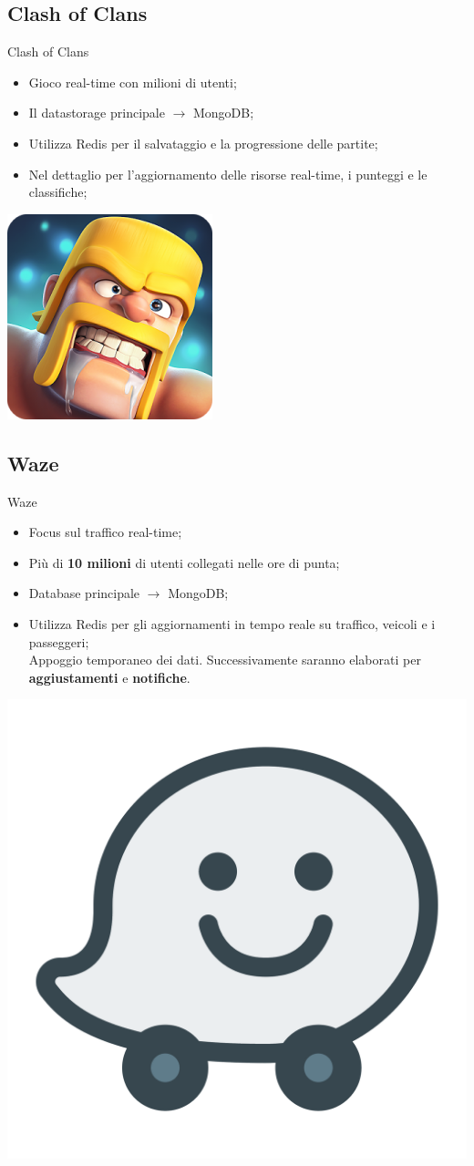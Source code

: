 \documentclass[xcolor=dvipsnames]{beamer}
\begin{document}
      \subsection{Clash of Clans}
        \begin{frame}{Clash of Clans}
          \begin{itemize}
            \item Gioco real-time con milioni di utenti;
            \item Il datastorage principale $\rightarrow$ MongoDB;
            \item Utilizza Redis per il salvataggio e la progressione delle partite;
            \item Nel dettaglio per l'aggiornamento delle risorse real-time, i punteggi e le classifiche;
          \end{itemize}
          \begin{center}
          \includegraphics[height=3.cm]{res/clash.png}
          \end{center}
        \end{frame}

        \subsection{Waze}
          \begin{frame}{Waze}
            \begin{itemize}
              \item Focus sul traffico real-time;
              \item Più di \textbf{10 milioni} di utenti collegati nelle ore di punta;
              \item Database principale $\rightarrow$ MongoDB;
              \item Utilizza Redis per gli aggiornamenti in tempo reale su traffico, veicoli e i passeggeri; \\
                    Appoggio temporaneo dei dati. Successivamente saranno elaborati per \textbf{aggiustamenti} e \textbf{notifiche}.
            \end{itemize}



            \begin{center}
            \includegraphics[height=2.cm]{res/waze.png}
            \end{center}
          \end{frame}
\end{document}

